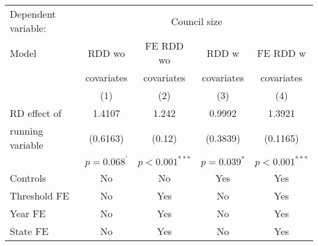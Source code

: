 \begin{tabular}{lcccc}
  \toprule
 \midrule
Dependent variable: & \multicolumn{4}{c}{Council size} \\ 
 Model & \acs{RDD} \acs{wo} & \acs{FE} \acs{RDD} \acs{wo} & \acs{RDD} \acs{w} & \acs{FE} \acs{RDD} \acs{w} \\ 
   &  covariates & covariates & covariates &  covariates \\ 
   & (1) & (2) & (3) & (4) \\ 
   \midrule
\ac{RD} effect of & 1.4107 & 1.242 & 0.9992 & 1.3921 \\ 
    running variable & (0.6163) & (0.12) & (0.3839) & (0.1165) \\ 
    & $p=0.068^{'}$ & $p<0.001^{***}$ & $p=0.039^{*}$ & $p<0.001^{***}$ \\ 
   \midrule
Controls & No & No & Yes & Yes \\ 
  Threshold \acs{FE} & No & Yes & No & Yes \\ 
  Year \acs{FE} & No & Yes & No & Yes \\ 
  State \acs{FE} & No & Yes & No & Yes \\ 
   \midrule
 \bottomrule
\end{tabular}
